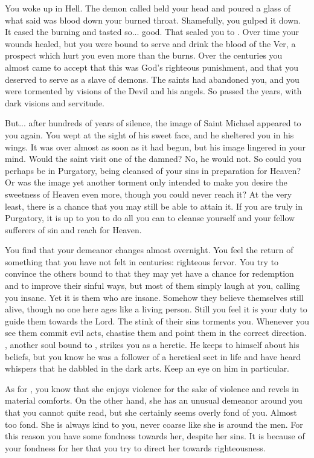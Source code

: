 \documentclass[char]{guildcamp4}
\begin{document}
You woke up in Hell. The demon called \cVone{} held your head and poured a glass of what \cVone{\they} said was \cVone{\their} blood down your burned throat. Shamefully, you gulped it down. It eased the burning and tasted so... good. That sealed you to \cVone{\them}. Over time your wounds healed, but you were bound to serve \cVone{\them} and drink the blood of the Ver, a prospect which hurt you even more than the burns. Over the centuries you almost came to accept that this was God's righteous punishment, and that you deserved to serve as a slave of demons. The saints had abandoned you, and you were tormented by visions of the Devil and his angels. So passed the years, with dark visions and servitude. 

But... after hundreds of years of silence, the image of Saint Michael appeared to you again. You wept at the sight of his sweet face, and he sheltered you in his wings. It was over almost as soon as it had begun, but his image lingered in your mind. Would the saint visit one of the damned? No, he would not. So could you perhaps be in Purgatory, being cleansed of your sins in preparation for Heaven? Or was the image yet another torment only intended to make you desire the sweetness of Heaven even more, though you could never reach it? At the very least, there is a chance that you may still be able to attain it. If you are truly in Purgatory, it is up to you to do all you can to cleanse yourself and your fellow sufferers of sin and reach for Heaven. 

You find that your demeanor changes almost overnight. You feel the return of something that you have not felt in centuries: righteous fervor. You try to convince the others bound to \cVone{} that they may yet have a chance for redemption and to improve their sinful ways, but most of them simply laugh at you, calling you insane. Yet it is them who are insane. Somehow they believe themselves still alive, though no one here ages like a living person. Still you feel it is your duty to guide them towards the Lord. The stink of their sins torments you. Whenever you see them commit evil acts, chastise them and point them in the correct direction. \cRasputin{}, another soul bound to \cVone{}, strikes you as a heretic. He keeps to himself about his beliefs, but you know he was a follower of a heretical sect in life and have heard whispers that he dabbled in the dark arts. Keep an eye on him in particular. 

As for \cJulie{}, you know that she enjoys violence for the sake of violence and revels in material comforts. On the other hand, she has an unusual demeanor around you that you cannot quite read, but she certainly seems overly fond of you. Almost too fond. She is always kind to you, never coarse like she is around the men. For this reason you have some fondness towards her, despite her sins. It is because of your fondness for her that you try to direct her towards righteousness.
\end{document}
